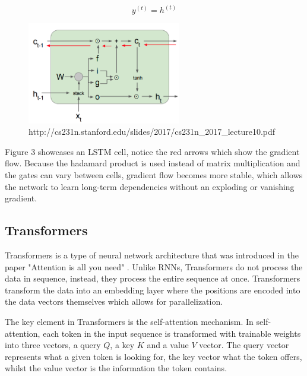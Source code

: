 \documentclass[11pt]{article}
\begin{document}
\begin{equation} y^{(t)} = h^{(t)} \end{equation}

\begin{figure}[h]
\centering
\includegraphics[width=0.6\textwidth]{lstm_diagram.png}
\caption{http://cs231n.stanford.edu/slides/2017/cs231n\_2017\_lecture10.pdf}
\end{figure}

Figure 3 showcases an LSTM cell, notice the red arrows which show the gradient flow. Because the hadamard product is used instead of matrix multiplication and the gates can vary between cells, gradient flow becomes more stable, which allows the network to learn long-term dependencies without an exploding or vanishing gradient.
\subsection{Transformers}


Transformers is a type of neural network architecture that was introduced in the paper "Attention is all you need" \cite{DBLP:journals/corr/VaswaniSPUJGKP17}. Unlike RNNs, Transformers do not process the data in sequence, instead, they process the entire sequence at once. Transformers transform the data into an embedding layer where the positions are encoded into the data vectors themselves which allows for parallelization.

The key element in Transformers is the self-attention mechanism. In self-attention, each token in the input sequence is transformed with trainable weights into three vectors, a query $Q$, a key $K$ and a value $V$ vector. The query vector represents what a given token is looking for, the key vector what the token offers, whilst the value vector is the information the token contains.
\end{document}
